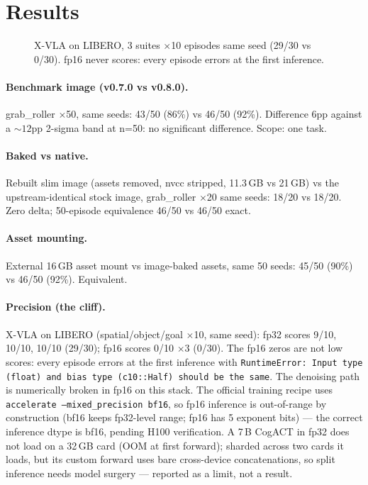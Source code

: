 \documentclass[journal]{IEEEtran}
\begin{document}
\section{Results}
\label{sec:results}

\begin{figure}[t]
\centering
{}
\caption{X-VLA on LIBERO, 3 suites $\times$10 episodes same seed (29/30 vs
0/30). fp16 never scores: every episode errors at the first inference.}
\label{fig:cliff}
\end{figure}

\paragraph{Benchmark image (v0.7.0 vs v0.8.0).} grab\_roller $\times$50, same
seeds: 43/50 (86\%) vs 46/50 (92\%). Difference 6pp against a ${\sim}12$pp
2-sigma band at n=50: no significant difference. Scope: one task.

\paragraph{Baked vs native.} Rebuilt slim image (assets removed, nvcc
stripped, 11.3\,GB vs 21\,GB) vs the upstream-identical stock image,
grab\_roller $\times$20 same seeds: 18/20 vs 18/20. Zero delta; 50-episode
equivalence 46/50 vs 46/50 exact.

\paragraph{Asset mounting.} External 16\,GB asset mount vs image-baked
assets, same 50 seeds: 45/50 (90\%) vs 46/50 (92\%). Equivalent.

\paragraph{Precision (the cliff).} X-VLA on LIBERO (spatial/object/goal
$\times$10, same seed): fp32 scores 9/10, 10/10, 10/10 (29/30); fp16 scores
0/10 $\times$3 (0/30). The fp16 zeros are not low scores: every episode
errors at the first inference with
\texttt{RuntimeError: Input type (float) and bias type (c10::Half) should be
the same}. The denoising path is numerically broken in fp16 on this stack.
The official training recipe uses \texttt{accelerate --mixed\_precision bf16},
so fp16 inference is out-of-range by construction (bf16 keeps fp32-level range;
fp16 has 5 exponent bits) --- the correct inference dtype is bf16, pending
H100 verification.
A 7\,B CogACT in fp32 does not load on a 32\,GB card (OOM at first forward);
sharded across two cards it loads, but its custom forward uses bare
cross-device concatenations, so split inference needs model surgery ---
reported as a limit, not a result.
\end{document}
